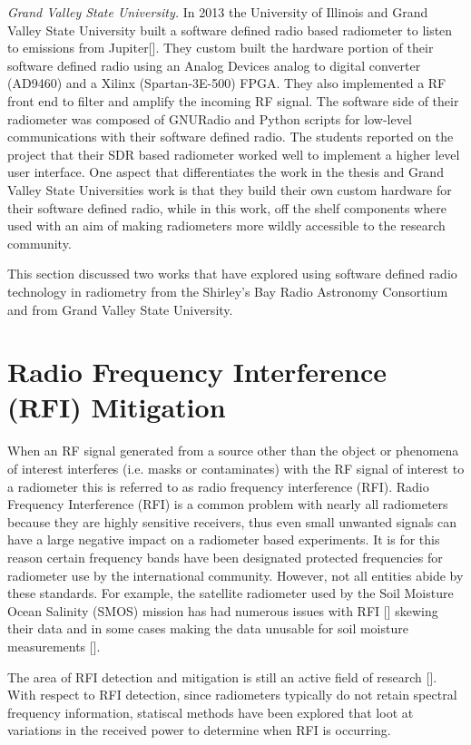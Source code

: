\emph{Grand Valley State University.}  In 2013 the University of Illinois and Grand Valley State University built a software defined radio based radiometer to listen to emissions from Jupiter[\cite{Behnke}].  They custom built the hardware portion of their software defined radio using an Analog Devices analog to digital converter (AD9460) and a Xilinx (Spartan-3E-500) FPGA.  They also implemented a RF front end to filter and amplify the incoming RF signal.  The software side of their radiometer was composed of GNURadio and Python scripts for low-level communications with their software defined radio.  The students reported on the project that their SDR based radiometer worked well to implement a higher level user interface.  One aspect that differentiates the work in the thesis and Grand Valley State Universities work is that they build their own custom hardware for their software defined radio, while in this work, off the shelf components where used with an aim of making radiometers more wildly accessible to the research community.

This section discussed two works that have explored using software defined radio technology in radiometry from the Shirley's Bay Radio Astronomy Consortium and from Grand Valley State University.

\section{Radio Frequency Interference (RFI) Mitigation}
When an RF signal generated from a source other than the object or phenomena of interest interferes (i.e. masks or contaminates) with the RF signal of interest to a radiometer this is referred to as radio frequency interference (RFI).  Radio Frequency Interference (RFI) is a common problem with nearly all radiometers because they are highly sensitive receivers, thus even small unwanted signals can have a large negative impact on a radiometer based experiments.  It is for this reason certain frequency bands have been designated protected frequencies for radiometer use by the international community.  However, not all entities abide by these standards.  For example, the satellite radiometer used by the Soil Moisture Ocean Salinity (SMOS) mission has had numerous issues with RFI [\cite{Kerr}] skewing their data and in some cases making the data unusable for soil moisture measurements [\cite{Richaume}].  

The area of RFI detection and mitigation is still an active field of research [\cite{Forte}].  With respect to RFI detection, since radiometers typically do not retain spectral frequency information, statiscal methods have been explored that loot at variations in the received power to determine when RFI is occurring.

